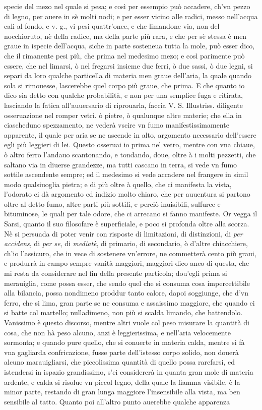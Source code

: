 \documentclass[11pt,twoside,openany]{book}
\begin{document}
specie del mezo nel quale si pesa; e così per essempio può accadere, ch'vn pezzo di legno, per auere in sè molti nodi; e per esser vicino alle radici, messo nell'acqua cali al fondo, e v. g., vi pesi quattr'once, e che limandone via, non del nocchioruto, nè della radice, ma della parte più rara, e che per sè stessa è men graue in ispecie dell'acqua, siche in parte sosteneua tutta la mole, può esser dico, che il rimanente pesi più, che prima nel medesimo mezo; e così parimente può essere, che nel limarsi, ò nel fregarsi insieme due ferri, ò due sassi, ò due legni, si separi da loro qualche particella di materia men graue dell'aria, la quale quando sola si rimouesse, lascerebbe quel corpo più graue, che prima. E che quanto io dico sia detto con qualche probabilità, e non per una semplice fuga e ritirata, lasciando la fatica all'auuersario di riprouarla, faccia V. S. Illustriss. diligente osseruazione nel romper vetri. ò pietre, ò qualunque altre materie; che ella in ciascheduno spezzamento, ne vederà vscire vn fumo manifestissimamente apparente, il quale per aria se ne ascende in alto, argomento necessario dell'essere egli più leggieri di lei. Questo osseruai io prima nel vetro, mentre con vna chiaue, ò altro ferro l'andauo scantonando, e tondando, doue, oltre à i molti pezzetti, che saltano via in diuerse grandezze, ma tutti cascano in terra, si vede vn fumo sottile ascendente sempre; ed il medesimo si vede accadere nel frangere in simil modo qualsiuoglia pietra; e di più oltre à quello, che ci manifesta la vista, l'odorato ci dà argomento ed indizio molto chiaro, che per auuentura si partono oltre al detto fumo, altre parti più sottili, e perciò inuisibili, sulfuree e bituminose, le quali per tale odore, che ci arrecano si fanno manifeste. Or vegga il Sarsi, quanto il suo filosofare è superficiale, e poco si profonda oltre alla scorza. Nè si persuada di poter venir con risposte di limitazioni, di distinzioni, di \textit{per accidens}, di \textit{per se}, di \textit{mediatè}, di primario, di secondario, ò d'altre chiacchiere, ch'io l'assicuro, che in vece di sostenere vn'errore, ne commetterà cento più graui, e produrrà in campo sempre vanità maggiori, maggiori dico anco di questa, che mi resta da considerare nel fin della presente particola; dou'egli prima si merauiglia, come possa esser, che sendo quel che si consuma cosa impercettibile alla bilancia, possa nondimeno proddur tanto calore, dapoi soggiunge, che d'vn ferro, che si lima, gran parte se ne consuma e assaissimo maggiore, che quando ei si batte col martello; nulladimeno, non più si scalda limando, che battendolo. Vanissimo è questo discorso, mentre altri vuole col peso misurare la quantità di cosa, che non hà peso alcuno, anzi è leggierissima, e nell'aria velocemente sormonta; e quando pure quello, che si conuerte in materia calda, mentre si fà vna gagliarda confricazione, fusse parte dell'istesso corpo solido, non douerà alcuno marauigliarsi, che piccolissima quantità di quello possa rarefarsi, ed istendersi in ispazio grandissimo, s'ei considererà in quanta gran mole di materia ardente, e calda si risolue vn piccol legno, della quale la fiamma visibile, è la minor parte, restando di gran lunga maggiore l'insensibile alla vista, ma ben sensibile al tatto. Quanto poi all'altro punto auerebbe qualche apparenza 
\end{document}

